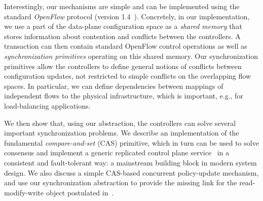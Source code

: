 \documentclass[conference]{sigcomm-alternate}
\newcommand{\petr}[1]{\textit{\textcolor{blue}{[petr]: #1}}} %
\begin{document}
Interestingly, our mechanisms are simple and can be implemented using the standard \emph{OpenFlow}
protocol (version 1.4~\cite{openflow}).
%
%
Concretely, in our implementation,
we use a part of the data-plane configuration space as a \emph{shared
  memory}  that stores information about  contention and conflicts
between the controllers.
A transaction can then contain standard OpenFlow control operations
as well as  \emph{synchronization primitives} operating on this shared
memory.
Our synchronization primitives allow the controllers to define
general notions of conflicts between configuration updates,
not restricted to simple conflicts on the overlapping flow spaces.
In particular, we can define dependencies between mappings of
independent flows to the physical infrastructure, which is important,
e.g., for load-balancing applications.


We then show that, using our abstraction, the controllers can
solve several important synchronization problems.
We describe an implementation of the fundamental
\emph{compare-and-set} (CAS) primitive,
which in turn can be used to solve consensus and
implement a generic replicated control plane service~\cite{Her91} in a consistent and
fault-tolerant way: a mainstream building block in
modern system design.
We also discuss a simple CAS-based concurrent policy-update mechanism,
and use our synchronization abstraction to provide
the missing link for the read-modify-write object
postulated in~\cite{stn}. %


\end{document}
